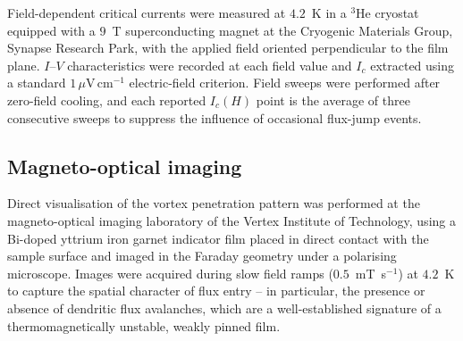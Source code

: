 Field-dependent critical currents were measured at $4.2$~K in a $^{3}$He cryostat equipped with a $9$~T superconducting magnet at the Cryogenic Materials Group, Synapse Research Park, with the applied field oriented perpendicular to the film plane. $I$--$V$ characteristics were recorded at each field value and $I_c$ extracted using a standard $1\,\mu\mathrm{V\,cm^{-1}}$ electric-field criterion. Field sweeps were performed after zero-field cooling, and each reported $I_c(H)$ point is the average of three consecutive sweeps to suppress the influence of occasional flux-jump events.

\subsection{Magneto-optical imaging}
Direct visualisation of the vortex penetration pattern was performed at the magneto-optical imaging laboratory of the Vertex Institute of Technology, using a Bi-doped yttrium iron garnet indicator film placed in direct contact with the sample surface and imaged in the Faraday geometry under a polarising microscope. Images were acquired during slow field ramps ($0.5$~mT~s$^{-1}$) at $4.2$~K to capture the spatial character of flux entry -- in particular, the presence or absence of dendritic flux avalanches, which are a well-established signature of a thermomagnetically unstable, weakly pinned film.
